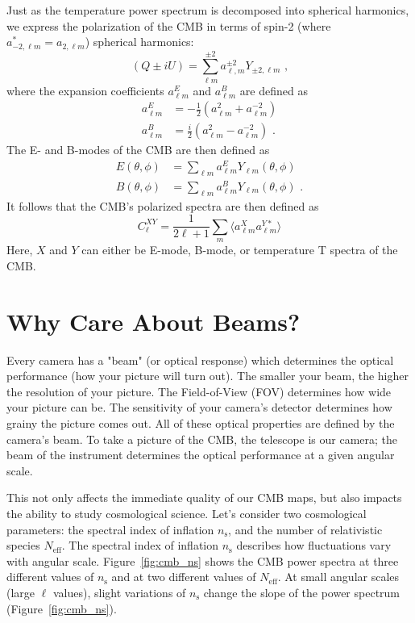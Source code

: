 Just as the temperature power spectrum is decomposed into spherical harmonics, we express the polarization of the CMB in terms of spin-2 (where $a^*_{-2,\ell m} = a_{2,\ell m}$) spherical harmonics:
\begin{equation}
(Q \pm iU) = \sum_{\ell m}^{\pm 2} a^{\pm 2}_{\ell ,m} Y_{\pm2,\ell m} \text{ ,}
\end{equation}
where the expansion coefficients $a_{\ell m }^E$ and $a_{\ell m }^B$ are defined as
\begin{equation}
\begin{split}
    a_{\ell m }^E & = -\frac{1}{2}(a_{\ell m}^2 + a_{\ell m}^{-2}) \\
    a_{\ell m }^B & = \frac{i}{2}(a_{\ell m}^2 - a_{\ell m}^{-2}) \text{ .}
\end{split}
\end{equation}
The E- and B-modes of the CMB are then defined as
\begin{equation}
\begin{split}
    E(\theta,\phi) & = \sum_{\ell m} a_{\ell m }^E Y_{\ell m}(\theta,\phi) \\
    B(\theta,\phi) & = \sum_{\ell m} a_{\ell m }^B Y_{\ell m}(\theta,\phi) \text{ .}
\end{split}
\end{equation}
It follows that the CMB's polarized spectra are then defined as
\begin{equation}
    C_{\ell}^{XY} = \frac{1}{2\ell+1}\sum_m \langle a_{\ell m}^{X} a_{\ell m}^{Y*} \rangle 
\end{equation}
Here, $X$ and $Y$ can either be E-mode, B-mode, or temperature T spectra of the CMB.

\section{Why Care About Beams?}
Every camera has a "beam" (or optical response) which determines the optical performance (how your picture will turn out).  The smaller your beam, the higher the resolution of your picture.   The Field-of-View (FOV) determines how wide your picture can be.  The sensitivity of your camera's detector determines how grainy the picture comes out.  All of these optical properties are defined by the camera's beam.  To take a picture of the CMB, the telescope is our camera; the beam of the instrument determines the optical performance at a given angular scale.  

This not only affects the immediate quality of our CMB maps, but also impacts the ability to study cosmological science.  Let's consider two cosmological parameters: the spectral index of inflation $n_{\text{s}}$, and the number of relativistic species $N_{\text{eff}}$.  The spectral index of inflation $n_{\text{s}}$ describes how fluctuations vary with angular scale.  Figure~\ref{fig:cmb_ns} shows the CMB power spectra at three different values of $n_{\text{s}}$ and at two different values of $N_{\text{eff}}$.  At small angular scales (large $\ell$ values), slight variations of $n_{\text{s}}$ change the slope of the power spectrum (Figure~\ref{fig:cmb_ns}).

